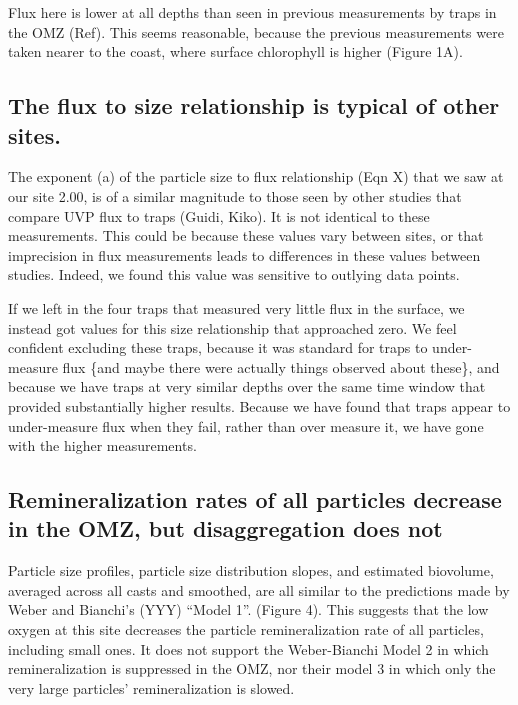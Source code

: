 \documentclass[]{article}
\begin{document}
Flux here is lower at all depths than seen in previous measurements by
traps in the OMZ (Ref). This seems reasonable, because the previous
measurements were taken nearer to the coast, where surface chlorophyll
is higher (Figure 1A).

\hypertarget{the-flux-to-size-relationship-is-typical-of-other-sites.}{%
\subsection{The flux to size relationship is typical of other
sites.}\label{the-flux-to-size-relationship-is-typical-of-other-sites.}}

The exponent (a) of the particle size to flux relationship (Eqn X) that
we saw at our site 2.00, is of a similar magnitude to those seen by
other studies that compare UVP flux to traps (Guidi, Kiko). It is not
identical to these measurements. This could be because these values vary
between sites, or that imprecision in flux measurements leads to
differences in these values between studies. Indeed, we found this value
was sensitive to outlying data points.

If we left in the four traps that measured very little flux in the
surface, we instead got values for this size relationship that
approached zero. We feel confident excluding these traps, because it was
standard for traps to under-measure flux \{and maybe there were actually
things observed about these\}, and because we have traps at very similar
depths over the same time window that provided substantially higher
results. Because we have found that traps appear to under-measure flux
when they fail, rather than over measure it, we have gone with the
higher measurements.

\hypertarget{remineralization-rates-of-all-particles-decrease-in-the-omz-but-disaggregation-does-not}{%
\subsection{Remineralization rates of all particles decrease in the OMZ,
but disaggregation does
not}\label{remineralization-rates-of-all-particles-decrease-in-the-omz-but-disaggregation-does-not}}

Particle size profiles, particle size distribution slopes, and estimated
biovolume, averaged across all casts and smoothed, are all similar to
the predictions made by Weber and Bianchi's (YYY) ``Model 1''. (Figure
4). This suggests that the low oxygen at this site decreases the
particle remineralization rate of all particles, including small ones.
It does not support the Weber-Bianchi Model 2 in which remineralization
is suppressed in the OMZ, nor their model 3 in which only the very large
particles' remineralization is slowed.
\end{document}
